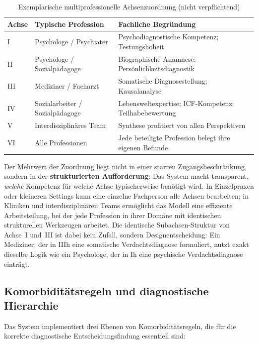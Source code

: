 \documentclass[11pt,a4paper]{article}
\begin{document}
\begin{table}[H]
\centering
\caption{Exemplarische multiprofessionelle Achsenzuordnung (nicht verpflichtend)}
\label{tab:professionen}
\begin{tabularx}{\textwidth}{lXX}
\toprule
\textbf{Achse} & \textbf{Typische Profession} & \textbf{Fachliche Begr\"undung} \\
\midrule
I & Psychologe / Psychiater & Psychodiagnostische Kompetenz; Testungshoheit \\
\addlinespace
II & Psychologe / Sozialp\"adagoge & Biographische Anamnese; Pers\"onlichkeitsdiagnostik \\
\addlinespace
III & Mediziner / Facharzt & Somatische Diagnosestellung; Kausalanalyse \\
\addlinespace
IV & Sozialarbeiter / Sozialp\"adagoge & Lebensweltexpertise; ICF-Kompetenz; Teilhabebewertung \\
\addlinespace
V & Interdisziplin\"ares Team & Synthese profitiert von allen Perspektiven \\
\addlinespace
VI & Alle Professionen & Jede beteiligte Profession belegt ihre eigenen Befunde \\
\bottomrule
\end{tabularx}
\end{table}

Der Mehrwert der Zuordnung liegt nicht in einer starren Zugangsbeschr\"ankung, sondern in der \textbf{strukturierten Aufforderung}: Das System macht transparent, \textit{welche} Kompetenz f\"ur welche Achse typischerweise ben\"otigt wird. In Einzelpraxen oder kleineren Settings kann eine einzelne Fachperson alle Achsen bearbeiten; in Kliniken und interdisziplin\"aren Teams erm\"oglicht das Modell eine effiziente Arbeitsteilung, bei der jede Profession in ihrer Dom\"ane mit identischen strukturellen Werkzeugen arbeitet. Die identische Subachsen-Struktur von Achse~I und~III ist dabei kein Zufall, sondern Designentscheidung: Ein Mediziner, der in IIIh eine somatische Verdachtsdiagnose formuliert, nutzt exakt dieselbe Logik wie ein Psychologe, der in Ih eine psychische Verdachtsdiagnose eintr\"agt.

\subsection{Komorbidit\"atsregeln und diagnostische Hierarchie}
\label{sec:komorbiditaet}

Das System implementiert drei Ebenen von Komorbidit\"atsregeln, die f\"ur die korrekte diagnostische Entscheidungsfindung essentiell sind:
\end{document}
